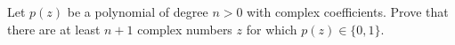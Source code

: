 Let $p(z)$ be a polynomial of degree $n>0$ with complex coefficients. Prove that there are at least $n+1$ complex numbers $z$ for which $p(z)\in \{0,1\}$.
